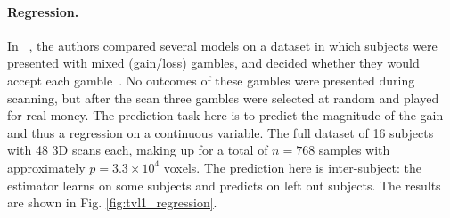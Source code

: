 \paragraph{Regression.}
In ~\citep{gramfort2013}, the authors compared several models on a dataset in which subjects were presented with mixed (gain/loss) gambles, and decided whether they would accept each gamble~\citep{jimura2012}. No outcomes of these gambles were presented during scanning, but after the scan three gambles were selected at random and played for real money. The prediction task here is to predict the magnitude of the gain and thus a regression on a continuous variable. The full dataset of 16
subjects with 48 3D scans each, making up for a total of $n=768$ samples with approximately $p=3.3 \times 10^4$ voxels. The prediction here is inter-subject: the estimator
learns on some subjects and predicts on left out subjects.
The results are shown in Fig. \ref{fig:tvl1_regression}.

